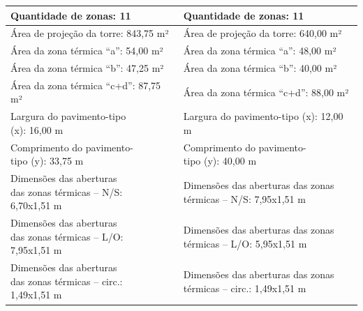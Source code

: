 \begin{table}[H]
\begin{tabular*}{\columnwidth}{@{\extracolsep{\fill}}ll}
        Quantidade de zonas: 11                                                             & Quantidade de zonas: 11                                                           \\ \hline
        Área de projeção da torre: 843,75 m²                                                & Área de projeção da torre: 640,00 m²                                              \\ \hline
        Área da zona térmica “a”: 54,00 m²                                                  & Área da zona térmica “a”: 48,00 m²                                                \\ \hline
        Área da zona térmica “b”: 47,25 m²                                                  & Área da zona térmica “b”: 40,00 m²                                                \\ \hline
        Área da zona térmica “c+d”: 87,75 m²                                                & Área da zona térmica “c+d”: 88,00 m²                                              \\ \hline
        \makecell[l]{Largura do pavimento-tipo\\ (x): 16,00 m}                              & Largura do pavimento-tipo (x): 12,00 m                                            \\ \hline
        \makecell[l]{Comprimento do pavimento-\\tipo (y): 33,75 m}                          & \makecell[l]{Comprimento do pavimento-\\tipo (y): 40,00 m}                        \\ \hline
        \makecell[l]{Dimensões das aberturas\\ das zonas térmicas – N/S:\\ 6,70x1,51 m}     & \makecell[l]{Dimensões das aberturas das zonas\\ térmicas – N/S: 7,95x1,51 m}     \\ \hline
        \makecell[l]{Dimensões das aberturas\\ das zonas térmicas – L/O:\\ 7,95x1,51 m}     & \makecell[l]{Dimensões das aberturas das zonas\\ térmicas – L/O: 5,95x1,51 m}     \\ \hline
        \makecell[l]{Dimensões das aberturas\\ das zonas térmicas – circ.:\\ 1,49x1,51 m}   & \makecell[l]{Dimensões das aberturas das zonas\\ térmicas – circ.: 1,49x1,51 m}   \\ \hline

\end{tabular*}
\end{table}
